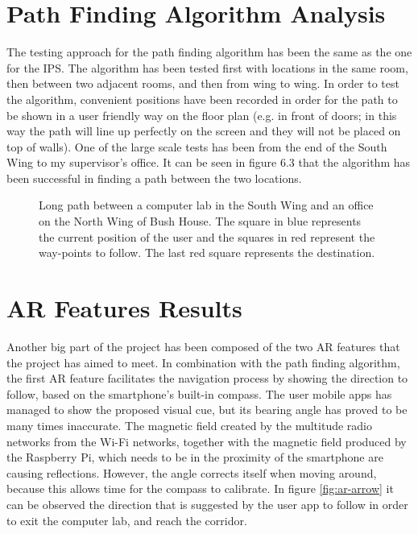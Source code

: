 \section{Path Finding Algorithm Analysis}
The testing approach for the path finding algorithm has been the same as the one for the IPS. The algorithm has been tested first with locations in the same room, then between two adjacent rooms, and then from wing to wing. In order to test the algorithm, convenient positions have been recorded in order for the path to be shown in a user friendly way on the floor plan (e.g. in front of doors; in this way the path will line up perfectly on the screen and they will not be placed on top of walls). One of the large scale tests has been from the end of the South Wing to my supervisor's office. It can be seen in figure 6.3 that the algorithm has been successful in finding a path between the two locations.

\begin{figure}[H]
    \centering
    \caption{Long path between a computer lab in the South Wing and an office on the North Wing of Bush House. The square in blue represents the current position of the user and the squares in red represent the way-points to follow. The last red square represents the destination.}
    \label{fig:nav-long-path}
\end{figure}

\section{AR Features Results}
Another big part of the project has been composed of the two AR features that the project has aimed to meet. In combination with the path finding algorithm, the first AR feature facilitates the navigation process by showing the direction to follow, based on the smartphone's built-in compass. The user mobile apps has managed to show the proposed visual cue, but its bearing angle has proved to be many times inaccurate. The magnetic field created by the multitude radio networks from the Wi-Fi networks, together with the magnetic field produced by the Raspberry Pi, which needs to be in the proximity of the smartphone are causing reflections. However, the angle corrects itself when moving around, because this allows time for the compass to calibrate. In figure \ref{fig:ar-arrow} it can be observed the direction that is suggested by the user app to follow in order to exit the computer lab, and reach the corridor.

